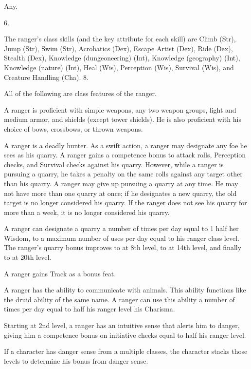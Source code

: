  Any.

 6.

The ranger's class skills (and the key attribute for each skill) are Climb (Str), Jump (Str), Swim (Str), Acrobatics (Dex), Escape Artist (Dex), Ride (Dex), Stealth (Dex), Knowledge (dungeoneering) (Int), Knowledge (geography) (Int), Knowledge (nature) (Int), Heal (Wis), Perception (Wis), Survival (Wis), and Creature Handling (Cha).
 8.


All of the following are class features of the ranger.

  A ranger is proficient with simple weapons, any two weapon groups, light and medium armor, and shields (except tower shields).   He is also proficient with his choice of bows, crossbows, or thrown weapons.

 A ranger is a deadly hunter. As a swift action, a ranger may designate any foe he sees as his quarry. A ranger gains a  competence bonus to attack rolls, Perception checks, and Survival checks against his quarry. However, while a ranger is pursuing a quarry, he takes a  penalty on the same rolls against any target other than his quarry. A ranger may give up pursuing a quarry at any time. He may not have more than one quarry at once; if he designates a new quarry, the old target is no longer considered his quarry. If the ranger does not see his quarry for more than a week, it is no longer considered his quarry.

\par A ranger can designate a quarry a number of times per day equal to 1 \add half her Wisdom, to a maximum number of uses per day equal to his ranger class level. The ranger's quarry bonus improves to  at 8th level, to  at 14th level, and finally to  at 20th level.

 A ranger gains Track as a bonus feat.

 A ranger has the ability to communicate with animals. This ability functions like the druid ability of the same name. A ranger can use this ability a number of times per day equal to half his ranger level \add his Charisma.

 Starting at 2nd level, a ranger has an intuitive sense that alerts him to danger, giving him a competence bonus on initiative checks equal to half his ranger level.
\par If a character has danger sense from a multiple classes, the character stacks those levels to determine his bonus from danger sense.

